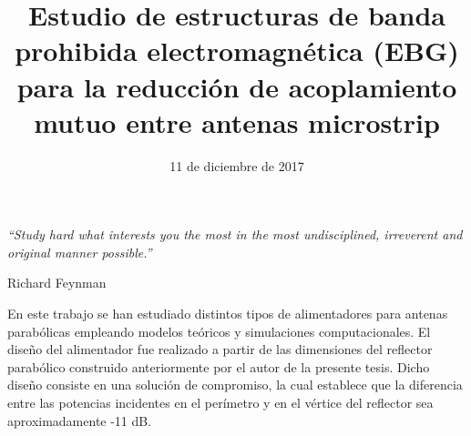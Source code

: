 \documentclass[a4paper, 11pt, twoside]{Thesis}  %
\begin{document}


\frontmatter  %

\title  {Estudio de estructuras de banda prohibida electromagnética (EBG) para la reducción de acoplamiento mutuo entre antenas microstrip}  %
\addresses  {\groupname\\\deptname\\\univname}  %
\date{11 de diciembre de 2017}  %
\subject{}
\keywords{}
\maketitle


\fancyhead{}  %
\rhead{\thepage}  %
\lhead{}  %




\pagestyle{empty}
\null\vfill
\textit{``Study hard what interests you the most in the most undisciplined, irreverent and original manner possible.''}
\begin{flushright}
Richard Feynman
\end{flushright}
\clearpage

\clearpage\pagestyle{empty}\mbox{}\clearpage  %




\pagestyle{empty}


\abstract

En este trabajo se han estudiado distintos tipos de alimentadores para antenas parabólicas empleando modelos teóricos y simulaciones computacionales. El diseño del alimentador fue realizado a partir de las dimensiones del reflector parabólico construido anteriormente por el autor de la presente tesis. Dicho diseño consiste en una solución de compromiso, la cual establece que la diferencia entre las potencias incidentes en el perímetro y en el vértice del reflector sea aproximadamente -11 dB.
\end{document}
